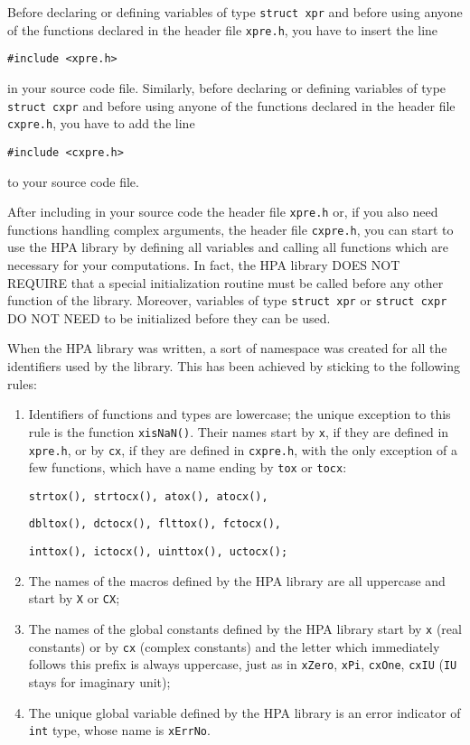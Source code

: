 \documentclass{article}
\begin{document}
Before declaring or defining variables of type \texttt{struct xpr}
and before using anyone of the functions declared in the header file
\texttt{xpre.h}, you have to insert the line

\begin{verbatim}
#include <xpre.h>
\end{verbatim}
in your source code file.
Similarly, before declaring or defining variables of type \texttt{struct cxpr}
and before using anyone of the functions declared in the header file
\texttt{cxpre.h}, you have to add the line

\begin{verbatim}
#include <cxpre.h>
\end{verbatim}
to your source code file.

After including in your source code the header file \texttt{xpre.h} or, 
if you also need functions handling complex arguments, the header file 
\texttt{cxpre.h}, you can start to use the HPA library
by defining all variables and calling 
all functions which are necessary for your computations.
In fact, the HPA library DOES NOT REQUIRE that a special initialization
routine must be called before any other function of the library.
Moreover, variables of  type \texttt{struct xpr} or \texttt{struct cxpr}
DO NOT NEED to be initialized before they can be used.

When the HPA library was written, a sort of namespace was created
for all the identifiers used by the library.
This has been achieved by sticking to the following rules:

\begin{enumerate}
\item Identifiers of functions and types are lowercase; the unique
exception to this rule is the function \texttt{xisNaN()}. Their names start
by \texttt{x}, if they are defined in \texttt{xpre.h}, or by \texttt{cx}, if they are defined
in \texttt{cxpre.h}, with the only exception of a few functions,
which have a name ending by \texttt{tox} or \texttt{tocx}: 
\begin{verbatim}
strtox(), strtocx(), atox(), atocx(),
\end{verbatim}
\begin{verbatim}
dbltox(), dctocx(), flttox(), fctocx(),
\end{verbatim}
\begin{verbatim}
inttox(), ictocx(), uinttox(), uctocx();
\end{verbatim}
\item The names of the macros defined by the HPA library are all uppercase
and start by \texttt{X} or \texttt{CX};
\item The names of the global constants defined by the HPA library start
by \texttt{x} (real constants) or by \texttt{cx} (complex constants) and the letter
which immediately follows this prefix is always uppercase, just as in
\texttt{xZero}, \texttt{xPi}, \texttt{cxOne}, \texttt{cxIU} (\texttt{IU} stays for imaginary
unit);
\item The unique global variable defined by the HPA library is an
error indicator of \texttt{int} type, whose name is \texttt{xErrNo}.
\end{enumerate}
\end{document}
